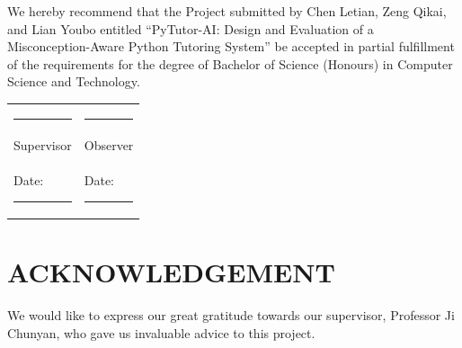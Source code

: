 \vspace{8mm}
\noindent
We hereby recommend that the Project submitted by Chen Letian, Zeng Qikai, and Lian Youbo entitled ``PyTutor-AI: Design and Evaluation of a Misconception-Aware Python Tutoring System'' be accepted in partial fulfillment of the requirements for the degree of Bachelor of Science (Honours) in Computer Science and Technology.

\vspace{22mm}
\noindent
\begin{tabular}{@{}p{}p{}@{}}
\rule{6cm}{0.4pt} & \rule{6cm}{0.4pt}\\
Supervisor & Observer\\
Date: \rule{4cm}{0.4pt} & Date: \rule{4cm}{0.4pt}
\end{tabular}

\clearpage
\chapter*{ACKNOWLEDGEMENT}
{}

We would like to express our great gratitude towards our supervisor, Professor Ji Chunyan, who gave us invaluable advice to this project.

\clearpage
